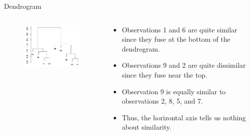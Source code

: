 \documentclass[
  ignorenonframetext,
  aspectratio=169,
]{beamer}
\begin{document}
\begin{frame}{Dendrogram}
\protect\hypertarget{dendrogram-1}{}
\begin{columns}[T]
\begin{column}{0.5\textwidth}
\begin{figure}

{\centering \includegraphics[width=3.14583in,height=\textheight]{images/small_dendogram.png}

}

\end{figure}
\end{column}

\begin{column}{0.5\textwidth}
\begin{itemize}
\item
  Observations 1 and 6 are quite similar since they fuse at the bottom
  of the dendrogram.
\item
  Observations 9 and 2 are quite dissimilar since they fuse near the
  top.
\item
  Observation 9 is equally similar to observations 2, 8, 5, and 7.
\item
  Thus, the horizontal axis tells us nothing about similarity.
\end{itemize}
\end{column}
\end{columns}
\end{frame}
\end{document}
